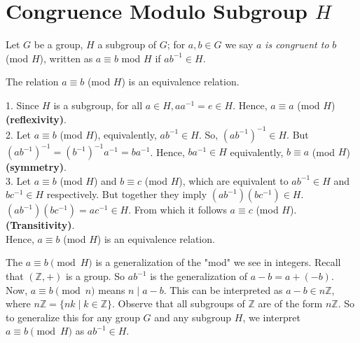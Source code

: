 \section{Congruence Modulo Subgroup $H$}
\begin{definition}
    Let $G$ be a group, $H$ a subgroup of $G$; for $a, b \in G$ we say $a$ \textit{is congruent to} $b$ (mod $H$), written as $a \equiv b$ mod $H$ if $ab^{-1} \in H$.
\end{definition}
\begin{lemma}
    The relation $a \equiv b$ (mod $H$) is an equivalence relation.
\end{lemma}
\begin{lemmaproof}
    1. Since $H$ is a subgroup, for all $a \in H, aa^{-1} = e \in H$. Hence, $a \equiv a$ (mod $H$) \textbf{(reflexivity)}.\\
    2. Let $a \equiv b$ (mod $H$), equivalently, $ab^{-1} \in H$. So, $(ab^{-1})^{-1} \in H$. But $(ab^{-1})^{-1} = (b^{-1})^{-1} a^{-1} = ba^{-1}$. Hence, $ba^{-1} \in H$ equivalently, $b \equiv a$ (mod $H$) \textbf{(symmetry)}.\\
    3. Let $a \equiv b$ (mod $H$) and $b \equiv c$ (mod $H$), which are equivalent to $ab^{-1} \in H$ and $bc^{-1} \in H$ respectively. But together they imply $(ab^{-1})(bc^{-1})\in H$. $(ab^{-1})(bc^{-1}) = ac^{-1} \in H$. From which it follows $a \equiv c$ (mod $H$). \textbf{(Transitivity)}.\\
    Hence, $a \equiv b$ (mod $H$) is an equivalence relation.
\end{lemmaproof}
\begin{remark}
    The \( a \equiv b \pmod{H} \) is a generalization of the "mod" we see in integers. Recall that \( (\mathbb{Z}, +) \) is a group. So \( ab^{-1} \) is the generalization of \( a - b = a + (-b) \). Now, \( a \equiv b \pmod{n} \) means \( n \mid a - b \). This can be interpreted as \( a - b \in n\mathbb{Z} \), where \( n\mathbb{Z} = \{ nk \mid k \in \mathbb{Z} \} \). Observe that all subgroups of \( \mathbb{Z} \) are of the form \( n\mathbb{Z} \). So to generalize this for any group \( G \) and any subgroup \( H \), we interpret \( a \equiv b \pmod{H} \) as \( ab^{-1} \in H \).
\end{remark}
